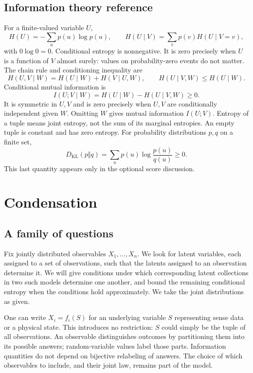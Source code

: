 \documentclass[11pt]{article}
\begin{document}
\subsection{Information theory reference}
\label{sec:it-reference}
For a finite-valued variable $U$,
\[
 H(U)=-\sum_u p(u)\log p(u),\qquad
 H(U\mid V)=\sum_v p(v)H(U\mid V=v),
\]
with $0\log 0=0$. Conditional entropy is nonnegative. It is zero precisely when
$U$ is a function of $V$ almost surely: values on probability-zero events do not
matter. The chain rule and conditioning inequality are
\[
 H(U,V\mid W)=H(U\mid W)+H(V\mid U,W),\qquad
 H(U\mid V,W)\le H(U\mid W).
\]
Conditional mutual information is
\[
 I(U;V\mid W)=H(U\mid W)-H(U\mid V,W)\ge0.
\]
It is symmetric in $U,V$ and is zero precisely when $U,V$ are conditionally
independent given $W$. Omitting $W$ gives mutual information $I(U;V)$.
Entropy of a tuple means joint entropy, not the sum of its marginal entropies.
An empty tuple is constant and has zero entropy.
For probability distributions $p,q$ on a finite set,
\[
 D_{\mathrm{KL}}(p\Vert q)=\sum_u p(u)\log\frac{p(u)}{q(u)}\ge0.
\]
This last quantity appears only in the optional score discussion.

\section{Condensation}
\subsection{A family of questions}
\label{sec:questions}
Fix jointly distributed observables $X_1,\ldots,X_n$. We look for latent
variables, each assigned to a set of observations, such that the latents
assigned to an observation determine it.
We will give conditions under which corresponding latent collections in two
such models determine one another, and bound the remaining conditional entropy
when the conditions hold approximately. We take the joint distributions as given.

\begin{remark}
One can write $X_i=f_i(S)$ for an underlying variable $S$ representing sense
data or a physical state. This introduces no restriction: $S$ could simply be
the tuple of all observations. An observable distinguishes outcomes by
partitioning them into its possible answers; random-variable values label those
parts. Information quantities do not depend on bijective relabeling of answers.
The choice of which observables to include, and their joint law, remains part
of the model.
\end{remark}
\end{document}
